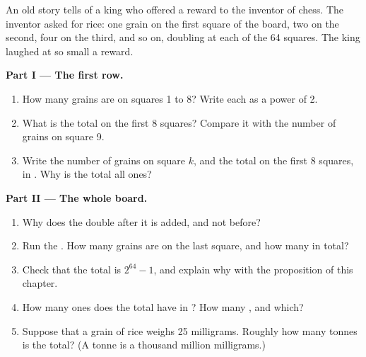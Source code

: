 \begin{problem}\label{pb:g8:binary-and-hexadecimal:1}
An old story tells of a king who offered a reward to the inventor of chess.
The inventor asked for rice: one grain on the first square of the board, two
on the second, four on the third, and so on, doubling at each of the 64
squares. The king laughed at so small a reward.

\medskip\noindent\textbf{Part I --- The first row.}
\begin{enumerate}
  \item How many grains are on squares 1 to 8? Write each as a power of 2.
  \item What is the total on the first 8 squares? Compare it with the number
    of grains on square 9.
  \item Write the number of grains on square $k$, and the total on the first
    8 squares, in . Why is the total all ones?
\end{enumerate}

\medskip\noindent\textbf{Part II --- The whole board.}

\label{lst:g8:binary-and-hexadecimal:grains}

\begin{enumerate}[resume]
  \item Why does the   double after it is added, and not
    before?
  \item Run the . How many grains are on the last square, and how
    many in total?
  \item Check that the total is $2^{64} - 1$, and explain why with the
    proposition of this chapter.
  \item How many ones does the total have in ? How many , and which?
  \item Suppose that a grain of rice weighs 25 milligrams. Roughly how many
    tonnes is the total? (A tonne is a thousand million milligrams.)
\end{enumerate}


\end{problem}
